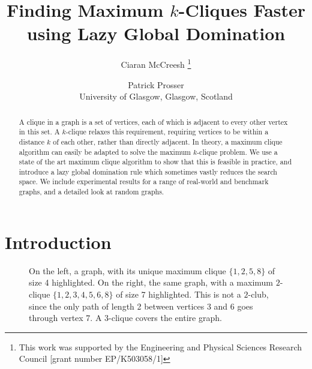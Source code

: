 \documentclass[letterpaper]{article}
\begin{document}
%
\title{Finding Maximum $k$-Cliques Faster using Lazy Global Domination}
\author{
    Ciaran McCreesh%
    \thanks{This work was supported by the Engineering and Physical Sciences Research Council [grant number EP/K503058/1]}
    \and
    Patrick Prosser
    \\ University of Glasgow, Glasgow, Scotland
}
\maketitle
\begin{abstract}
    A clique in a graph is a set of vertices, each of which is adjacent to every other vertex in
    this set. A $k$-clique relaxes this requirement, requiring vertices to be within a distance $k$
    of each other, rather than directly adjacent. In theory, a maximum clique algorithm can easily
    be adapted to solve the maximum $k$-clique problem. We use a state of the art maximum clique
    algorithm to show that this is feasible in practice, and introduce a lazy global domination rule
    which sometimes vastly reduces the search space. We include experimental results for a range of
    real-world and benchmark graphs, and a detailed look at random graphs.
\end{abstract}

\section{Introduction}

\begin{figure}[b] %
    \centering
    \begin{tikzpicture}
    \end{tikzpicture}\hspace{4em}\begin{tikzpicture}
    \end{tikzpicture}

    \caption{On the left, a graph, with its unique maximum clique $\{1, 2, 5, 8\}$ of size 4
        highlighted. On the right, the same graph, with a maximum $2$-clique $\{1, 2, 3, 4, 5, 6, 8\}$
        of size 7 highlighted. This is not a $2$-club, since the only path of length 2 between vertices 3 and 6
        goes through vertex 7. A $3$-clique covers the entire graph.}
    \label{figure:k-cliques}
\end{figure}
\end{document}

